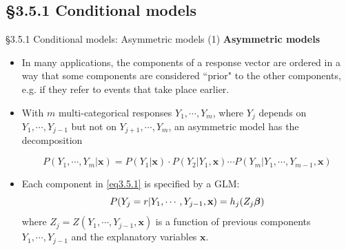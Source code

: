 \documentclass{beamer}
\newcommand{\currentsubsection}{}
\let\oldsubsection\subsection
\renewcommand{\subsection}[1]{\oldsubsection{#1}\renewcommand{\currentsubsection}{#1}}
\begin{document}
\subsection{\S3.5.1 Conditional models}\label{sec:3.5.1}

%
%
%

%
%



\begin{frame}{\S3.5.1 Conditional models: Asymmetric models (1)}
\noindent \textbf{Asymmetric models}
\begin{itemize}
\item 
In many applications, the components of a response vector are ordered in a way that some components
are considered ``prior" to the other components, e.g. if they refer to events that take place earlier. 

\item
With $m$ multi-categorical responses $Y_1,\cdots, Y_m$, where $Y_j$ depends on $Y_1, \cdots, Y_{j-1}$
but not on $Y_{j+1},\cdots, Y_m$, an asymmetric model has the decomposition


\begin{equation}
P(Y_1,\cdots,Y_m|\textbf{x})=P(Y_1|\textbf{x})\cdot P(Y_2|Y_1, \textbf{x})\cdots
P(Y_m|Y_1,\cdots, Y_{m-1}, \textbf{x})
\label{eq3.5.1}
\end{equation}
\item
Each component in \eqref{eq3.5.1} is specified by a GLM:
\begin{equation} 
P(Y_j=r|Y_1,\cdots, Y_{j-1}, \textbf{x})=h_j(Z_j\mbox{\boldmath $\beta$})
\label{eq3.5.2}
\end{equation}
where $Z_j=Z(Y_1,\cdots, Y_{j-1}, \textbf{x})$ is a function of previous components $Y_1,\cdots, Y_{j-1}$
and the explanatory variables $\textbf{x}$. 
\end{itemize}
\end{frame}
\end{document}
